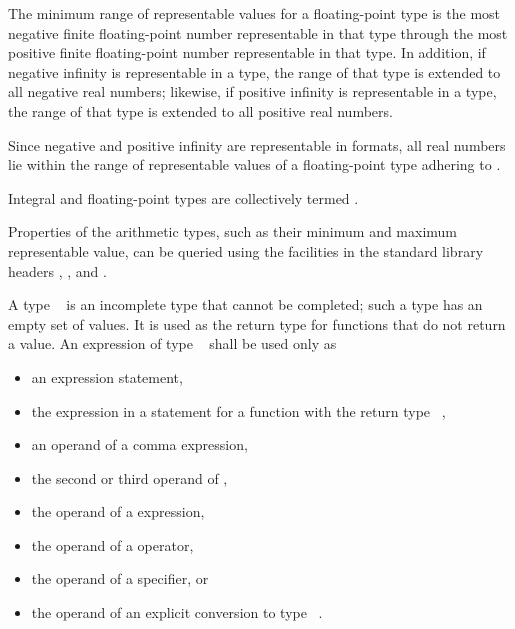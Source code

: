 \pnum
The minimum range of representable values for a floating-point type is
the most negative finite floating-point number representable
in that type through
the most positive finite floating-point number representable in that type.
In addition, if negative infinity is representable in a type,
the range of that type is extended to all negative real numbers;
likewise, if positive infinity is representable in a type,
the range of that type is extended to all positive real numbers.
\begin{note}
Since negative and positive infinity are representable
in \IsoFloatUndated{} formats,
all real numbers lie within the range of representable values of
a floating-point type adhering to \IsoFloatUndated{}.
\end{note}

\pnum
Integral and floating-point types are collectively
termed .
\begin{note}
Properties of the arithmetic types,
such as their minimum and maximum representable value,
can be queried using the facilities in the standard library headers
,
, and
.
\end{note}

\pnum
{}%
A type \cv{}~
is an incomplete type that cannot be completed; such a type has
an empty set of values. It is used as the return
type for functions that do not return a value.
An expression of type \cv{}~ shall
be used only as
\begin{itemize}
\item an expression statement,
\item the expression in a  statement
for a function with the return type \cv{}~,
\item an operand of a comma expression,
\item the second or third operand of ,
\item the operand of a  expression,
\item the operand of a  operator,
\item the operand of a  specifier, or
\item the operand of an explicit conversion to type
\cv{}~.
\end{itemize}

